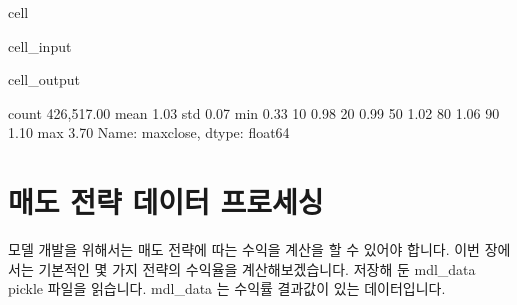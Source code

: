 \documentclass[letterpaper,10pt,english]{jupyterBook}
\begin{document}
\begin{sphinxuseclass}{cell}\begin{sphinxVerbatimInput}

\begin{sphinxuseclass}{cell_input}
\begin{sphinxVerbatim}[commandchars=\\\{\}]
  
\PYG{p}{[}\PYG{p}{]}\PYG{p}{[}    \PYG{p}{]}
\end{sphinxVerbatim}

\end{sphinxuseclass}\end{sphinxVerbatimInput}
\begin{sphinxVerbatimOutput}

\begin{sphinxuseclass}{cell_output}
\begin{sphinxVerbatim}[commandchars=\\\{\}]
count   426,517.00
mean          1.03
std           0.07
min           0.33
10\PYGZpc{}           0.98
20\PYGZpc{}           0.99
50\PYGZpc{}           1.02
80\PYGZpc{}           1.06
90\PYGZpc{}           1.10
max           3.70
Name: max\PYGZus{}close, dtype: float64
\end{sphinxVerbatim}

\end{sphinxuseclass}\end{sphinxVerbatimOutput}

\end{sphinxuseclass}

\part{ 매도 전략 데이터 프로세싱}
\label{\detokenize{chapter4/4.4.4_Data_Processing:br}}
\sphinxAtStartPar
모델 개발을 위해서는 매도 전략에 따는 수익을 계산을 할 수 있어야 합니다. 이번 장에서는 기본적인 몇 가지 전략의 수익율을 계산해보겠습니다. 저장해 둔 mdl\_data pickle 파일을 읽습니다. mdl\_data 는 수익률 결과값이 있는 데이터입니다.
\end{document}
